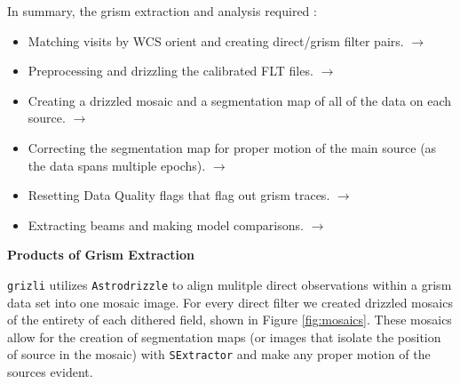 \documentclass[12pt]{article}
\begin{document}
{{In summary, the grism extraction and analysis required : 
\begin{itemize}
\item Matching visits by WCS orient and creating direct/grism filter pairs.
    \href{http://grizli-calibration.readthedocs.io/en/latest/visit_matching.html#visit-matching-tools}{
        \color{blue}$\rightarrow$}
\item Preprocessing and drizzling the calibrated FLT files. 
    \href{http://grizli-calibration.readthedocs.io/en/latest/visit_matching.html#actually-matching-and-preprocessing-visits}{
        \color{blue}$\rightarrow$}
\item Creating a drizzled mosaic and a segmentation map of all of the data on each source.
    \href{http://grizli-calibration.readthedocs.io/en/latest/drizzling_extracting_etc.html}{
        \color{blue}$\rightarrow$ }
\item Correcting the segmentation map for proper motion of the main source (as the data spans multiple epochs).
    \href{http://grizli-calibration.readthedocs.io/en/latest/drizzling_extracting_etc.html#correcting-seg-map-for-proper-motion}{
        \color{blue}$\rightarrow$ }
\item Resetting Data Quality flags that flag out grism traces.
    \href{http://grizli-calibration.readthedocs.io/en/latest/objects_models_outputs.html#stopping-the-runaway-dq-flag-train}{
        \color{blue}$\rightarrow$ }
\item Extracting beams and making model comparisons. 
    \href{http://grizli-calibration.readthedocs.io/en/latest/objects_models_outputs.html#beams-and-initial-testing}{
        \color{blue}$\rightarrow$ }
\end{itemize}

{\bf Products of Grism Extraction} 

\texttt{grizli} utilizes \texttt{Astrodrizzle} to align mulitple direct
observations within a grism data set into one mosaic image. For every direct filter we created drizzled mosaics
of the entirety of each dithered field, shown in Figure \ref{fig:mosaics}. These mosaics allow for the creation 
of segmentation maps (or images that isolate the position of source in the
mosaic) with \texttt{SExtractor} and make any proper motion of the sources evident. 


}}
\end{document}
